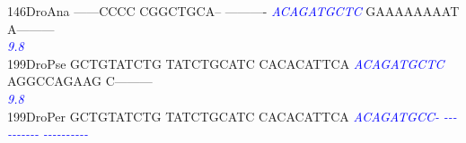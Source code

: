 \documentclass[11pt,twoside,reqno,a4paper]{article}
\begin{document}
{146\hspace*{1\charwidth}DroAna	------CCCC	CGGCTGCA--	----------	\textit{\textcolor{Blue}{A}}\textit{\textcolor{Blue}{C}}\textit{\textcolor{Blue}{A}}\textit{\textcolor{Blue}{G}}\textit{\textcolor{Blue}{A}}\textit{\textcolor{Blue}{T}}\textit{\textcolor{Blue}{G}}\textit{\textcolor{Blue}{C}}\textit{\textcolor{Blue}{T}}\textit{\textcolor{Blue}{C}}	GAAAAAAAAT	A---------	\\
\hspace*{4\charwidth}\hspace*{7\charwidth}\hspace*{1\charwidth}\hspace*{1\charwidth}\hspace*{1\charwidth}\hspace*{30\charwidth}\textit{\textcolor{Blue}{9.8}}\hspace*{1\charwidth}\hspace*{1\charwidth}\hspace*{1\charwidth}\\
199\hspace*{1\charwidth}DroPse	GCTGTATCTG	TATCTGCATC	CACACATTCA	\textit{\textcolor{Blue}{A}}\textit{\textcolor{Blue}{C}}\textit{\textcolor{Blue}{A}}\textit{\textcolor{Blue}{G}}\textit{\textcolor{Blue}{A}}\textit{\textcolor{Blue}{T}}\textit{\textcolor{Blue}{G}}\textit{\textcolor{Blue}{C}}\textit{\textcolor{Blue}{T}}\textit{\textcolor{Blue}{C}}	AGGCCAGAAG	C---------	\\
\hspace*{4\charwidth}\hspace*{7\charwidth}\hspace*{1\charwidth}\hspace*{1\charwidth}\hspace*{1\charwidth}\hspace*{30\charwidth}\textit{\textcolor{Blue}{9.8}}\hspace*{1\charwidth}\hspace*{1\charwidth}\hspace*{1\charwidth}\\
199\hspace*{1\charwidth}DroPer	GCTGTATCTG	TATCTGCATC	CACACATTCA	\textit{\textcolor{Blue}{A}}\textit{\textcolor{Blue}{C}}\textit{\textcolor{Blue}{A}}\textit{\textcolor{Blue}{G}}\textit{\textcolor{Blue}{A}}\textit{\textcolor{Blue}{T}}\textit{\textcolor{Blue}{G}}\textit{\textcolor{Blue}{C}}\textit{\textcolor{Blue}{C}}\textit{\textcolor{Blue}{-}}	\textit{\textcolor{Blue}{-}}\textit{\textcolor{Blue}{-}}\textit{\textcolor{Blue}{-}}\textit{\textcolor{Blue}{-}}\textit{\textcolor{Blue}{-}}\textit{\textcolor{Blue}{-}}\textit{\textcolor{Blue}{-}}\textit{\textcolor{Blue}{-}}\textit{\textcolor{Blue}{-}}\textit{\textcolor{Blue}{-}}	\textit{\textcolor{Blue}{-}}\textit{\textcolor{Blue}{-}}\textit{\textcolor{Blue}{-}}\textit{\textcolor{Blue}{-}}\textit{\textcolor{Blue}{-}}\textit{\textcolor{Blue}{-}}\textit{\textcolor{Blue}{-}}\textit{\textcolor{Blue}{-}}\textit{\textcolor{Blue}{-}}\textit{\textcolor{Blue}{-}}	\\
}
\end{document}
